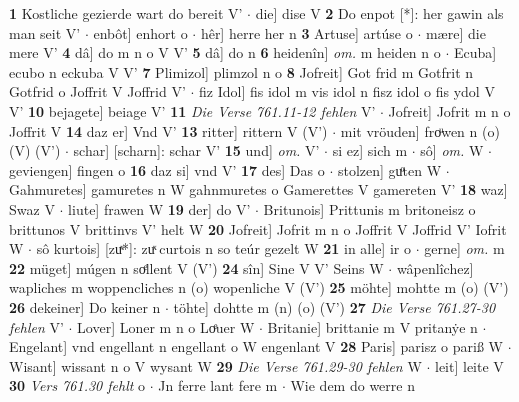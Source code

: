 \documentclass[8pt,a4paper,notitlepage]{article}
\begin{document}
\begin{table}[ht]
\begin{minipage}[t]{0.5\linewidth}
\textbf{1} Kostliche gezierde wart do bereit V'  $\cdot$ die] dise V \textbf{2} Do enpot [*]: her gawin als man seit V'  $\cdot$ enbôt] enhort o  $\cdot$ hêr] herre her n \textbf{3} Artuse] artúse o  $\cdot$ mære] die mere V' \textbf{4} dâ] do m n o V V' \textbf{5} dâ] do n \textbf{6} heidenîn] \textit{om.} m heiden n o  $\cdot$ Ecuba] ecubo n eckuba V V' \textbf{7} Plimizol] plimzol n o \textbf{8} Jofreit] Got frid m Gotfrit n Gotfrid o Joffrit V Joffrid V'  $\cdot$ fiz Idol] fis idol m vis idol n fisz idol o fis ydol V V' \textbf{10} bejagete] beiage V' \textbf{11} \textit{Die Verse 761.11-12 fehlen} V'   $\cdot$ Jofreit] Jofrit m n o Joffrit V \textbf{14} daz er] Vnd V' \textbf{13} ritter] rittern V (V')  $\cdot$ mit vröuden] froͧwen n (o) (V) (V')  $\cdot$ schar] [scharn]: schar V' \textbf{15} und] \textit{om.} V'  $\cdot$ si ez] sich m  $\cdot$ sô] \textit{om.} W  $\cdot$ geviengen] fingen o \textbf{16} daz si] vnd V' \textbf{17} des] Das o  $\cdot$ stolzen] guͦten W  $\cdot$ Gahmuretes] gamuretes n W gahnmuretes o Gamerettes V gamereten V' \textbf{18} waz] Swaz V  $\cdot$ liute] frawen W \textbf{19} der] do V'  $\cdot$ Britunois] Prittunis m britoneisz o brittunos V brittinvs V' helt W \textbf{20} Jofreit] Jofrit m n o Joffrit V Joffrid V' Iofrit W  $\cdot$ sô kurtois] [zuͯ*]: zuͯ curtois n so teúr gezelt W \textbf{21} in alle] ir o  $\cdot$ gerne] \textit{om.} m \textbf{22} müget] múgen n soͤllent V (V') \textbf{24} sîn] Sine V V' Seins W  $\cdot$ wâpenlîchez] wapliches m woppencliches n (o) wopenliche V (V') \textbf{25} möhte] mohtte m (o) (V') \textbf{26} dekeiner] Do keiner n  $\cdot$ töhte] dohtte m (n) (o) (V') \textbf{27} \textit{Die Verse 761.27-30 fehlen} V'   $\cdot$ Lover] Loner m n o Loͤuer W  $\cdot$ Britanie] brittanie m V pritanẏe n  $\cdot$ Engelant] vnd engellant n engellant o W engenlant V \textbf{28} Paris] parisz o pariß W  $\cdot$ Wisant] wissant n o V wysant W \textbf{29} \textit{Die Verse 761.29-30 fehlen} W   $\cdot$ leit] leite V \textbf{30} \textit{Vers 761.30 fehlt} o   $\cdot$ Jn ferre lant fere m  $\cdot$ Wie dem do werre n \newline
\end{minipage}
\end{table}
\newpage
\end{document}
